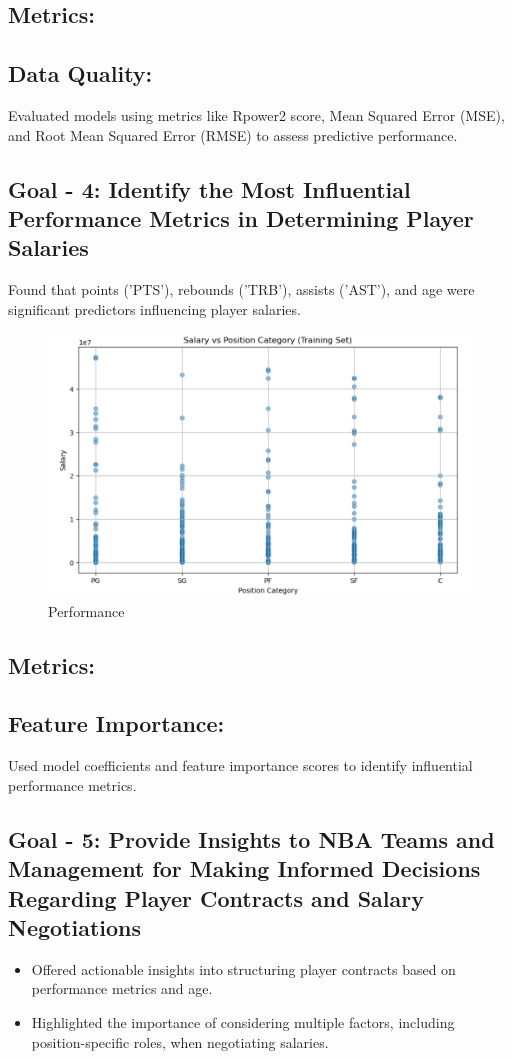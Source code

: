 \documentclass{article}
\begin{document}
\subsection*{Metrics:}
\subsection*{Data Quality:}
 Evaluated models using metrics like Rpower2 score, Mean Squared Error (MSE), and Root Mean Squared Error (RMSE) to assess predictive performance.


\subsection*{Goal - 4: Identify the Most Influential Performance Metrics in Determining Player Salaries}
Found that points ('PTS'), rebounds ('TRB'), assists ('AST'), and age were significant predictors influencing player salaries.

\FloatBarrier
\begin{figure}[h]
    \centering
    \includegraphics[width=0.9\linewidth]{performance.png}
    \caption{Performance}
    \label{fig:confusion_matrix_code}
\end{figure}

\subsection*{Metrics:}
\subsection*{Feature Importance:}
Used model coefficients and feature importance scores to identify influential performance metrics.


\subsection*{Goal - 5: Provide Insights to NBA Teams and Management for Making Informed Decisions Regarding Player Contracts and Salary Negotiations}
\begin{itemize}
    \item Offered actionable insights into structuring player contracts based on performance metrics and age.
    \item Highlighted the importance of considering multiple factors, including position-specific roles, when negotiating salaries.
\end{itemize}
\end{document}
